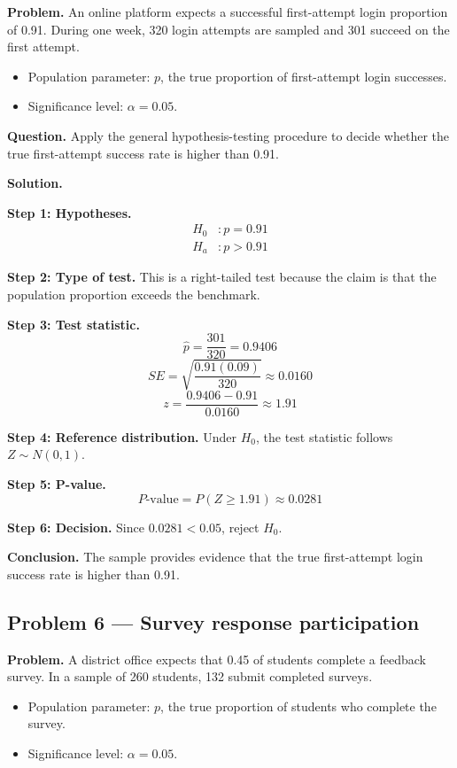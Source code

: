 \begin{ExamProblems}
\textbf{Problem.} An online platform expects a successful first-attempt login proportion of 0.91. During one week, 320 login attempts are sampled and 301 succeed on the first attempt.
\begin{itemize}
    \item Population parameter: \(p\), the true proportion of first-attempt login successes.
    \item Significance level: \(\alpha=0.05\).
\end{itemize}

\textbf{Question.} Apply the general hypothesis-testing procedure to decide whether the true first-attempt success rate is higher than 0.91.

\textbf{Solution.}

\textbf{Step 1: Hypotheses.}
\[
\begin{aligned}
H_0&: p = 0.91 \\
H_a&: p > 0.91
\end{aligned}
\]

\textbf{Step 2: Type of test.} This is a right-tailed test because the claim is that the population proportion exceeds the benchmark.

\textbf{Step 3: Test statistic.}
\[
\hat{p}=\frac{301}{320}=0.9406
\]
\[
SE=\sqrt{\frac{0.91(0.09)}{320}}\approx 0.0160
\]
\[
z=\frac{0.9406-0.91}{0.0160}\approx 1.91
\]

\textbf{Step 4: Reference distribution.} Under \(H_0\), the test statistic follows \(Z\sim N(0,1)\).

\textbf{Step 5: P-value.}
\[
P\text{-value}=P(Z\ge 1.91)\approx 0.0281
\]

\textbf{Step 6: Decision.} Since \(0.0281<0.05\), reject \(H_0\).

\textbf{Conclusion.} The sample provides evidence that the true first-attempt login success rate is higher than 0.91.

\hypertarget{c4-ex6}{}
\item
\subsection*{Problem 6 — Survey response participation}

\textbf{Problem.} A district office expects that 0.45 of students complete a feedback survey. In a sample of 260 students, 132 submit completed surveys.
\begin{itemize}
    \item Population parameter: \(p\), the true proportion of students who complete the survey.
    \item Significance level: \(\alpha=0.05\).
\end{itemize}


\end{ExamProblems}

